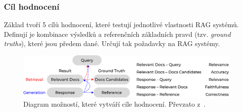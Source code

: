 \subsubsection{Cíl hodnocení}
\label{targets}
Základ tvoří 5 cílů hodnocení, které testují jednotlivé vlastnosti RAG systémů. Definují je kombinace výsledků a referenčních základních pravd (tzv. \textit{ground truths}), které jsou předem dané. Určují tak požadavky na RAG systémy.

\begin{figure}[H]
    \centering
    \includegraphics[width=1\linewidth]{obrazky/target.pdf}
    \caption{Diagram možností, které vytváří cíle hodnocení. Převzato z~\cite{yu2025evaluationrag}.}
    \label{fig:targets}
\end{figure}

